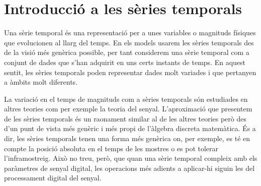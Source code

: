 






\section{Introducció a les sèries temporals}


Una sèrie temporal és una representació per a unes variables o
magnituds físiques que evolucionen al llarg del temps.  En els models
usarem les sèries temporals des de la visió més genèrica possible, per
tant considerem una sèrie temporal com a conjunt de dades que s'han
adquirit en uns certs instants de temps.  En aquest sentit, les sèries
temporals poden representar dades molt variades i que pertanyen a
àmbits molt diferents.


La variació en el temps de magnituds com a sèries temporals són
estudiades en altres teories com per exemple la teoria del senyal. 
L'aproximació que presentem de les sèries temporals és un raonament
similar al de les altres teories però des d'un punt de vista més
genèric i més propi de l'àlgebra discreta matemàtica.  És a dir,
les sèries temporals tenen una forma més genèrica on, per exemple, es
 té en compte la posició absoluta en el temps de les mostres o
es pot tolerar l'inframostreig.  Això no treu, però, que quan una
sèrie temporal compleix amb els paràmetres de senyal digital, les
operacions més adients a aplicar-hi siguin les del processament
digital del senyal.

